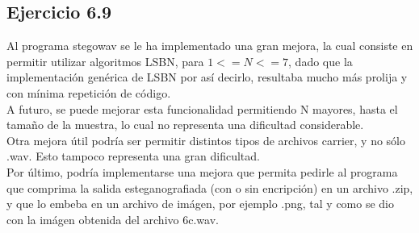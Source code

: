 \documentclass{article}
\begin{document}
\subsection{Ejercicio 6.9}
\noindent Al programa stegowav se le ha implementado una gran mejora, la cual consiste en permitir utilizar algoritmos LSBN, para $1 <= N <= 7$, dado que la implementación genérica de LSBN por así decirlo, resultaba mucho más prolija y con mínima repetición de código. \\
\noindent A futuro, se puede mejorar esta funcionalidad permitiendo N mayores, hasta el tamaño de la muestra, lo cual no representa una dificultad considerable.\\
\noindent Otra mejora útil podría ser permitir distintos tipos de archivos carrier, y no sólo .wav. Esto tampoco representa una gran dificultad. \\
\noindent Por último, podría implementarse una mejora que permita pedirle al programa que comprima la salida esteganografiada (con o sin encripción) en un archivo .zip, y que lo embeba en un archivo de imágen, por ejemplo .png, tal y como se dio con la imágen obtenida del archivo 6c.wav.
\end{document}
